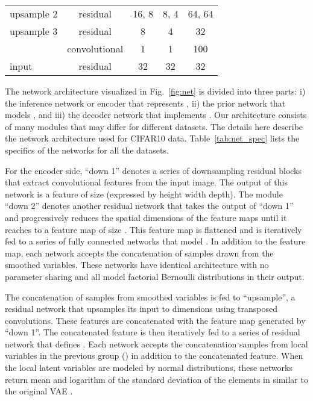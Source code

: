 \documentclass{article}
\newcommand{\uu}{}
\begin{document}
\begin{figure*}
\begin{tabular}{ l|c|c|c|c}
upsample 2						 	     & residual &     16\uu, 8                              &          8\uu, 4              &         64\uu, 64    \\
upsample 3						 	     & residual &      8\uu                                   &           4\uu                 &       32\uu            \\
 & convolutional &              1                       &                 1                &     100    \\
input  & residual    &              32                       &                 32                &     32    \\

\end{tabular}
\end{figure*}

The network architecture visualized in Fig.~\ref{fig:net} is divided into three parts: i) the inference network or encoder that represents , ii)
the prior network that models , and iii)
the decoder network that implements . Our architecture consists of many modules that may differ for different datasets. The details here describe the 
network architecture used for CIFAR10 data. Table~\ref{tab:net_spec} lists the specifics of the networks for all the datasets.

For the encoder side, ``down 1'' denotes a series of downsampling residual blocks that extract convolutional features from the input image. The output of this network is a feature of size  (expressed by height  width  depth). The module ``down 2'' denotes another residual network that takes the output of ``down 1'' and progressively reduces the spatial dimensions of the feature maps until it reaches to a feature map of size . This feature map is flattened and is iteratively fed to a series of fully connected networks that model . In addition to the feature map, each network accepts the concatenation of samples drawn from the smoothed variables. These networks have identical architecture with no parameter sharing and all model factorial Bernoulli distributions in their output.

The concatenation of samples from smoothed variables  is fed to ``upsample'', a residual network that upsamples its 
input to  dimensions using transposed convolutions. These features are concatenated with the feature
map generated by ``down 1''.  The concatenated feature is then iteratively fed to a series of residual network 
that defines . Each network accepts the concatenation samples from local variables 
in the previous group () in addition to the concatenated feature. When the local latent variables are modeled 
by normal distributions, these networks return mean and logarithm of the standard deviation of the elements in  similar to the original VAE \cite{kingma2014vae}.
\end{document}
